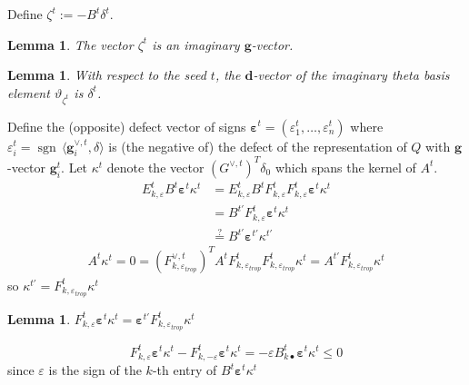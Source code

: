 \documentclass{amsart}
\newtheorem{lemma}[theorem]{Lemma}
\numberwithin{theorem}{section}
\newcommand{\bfd}{\boldsymbol{d}}
\newcommand{\bfg}{\boldsymbol{g}}
\newcommand{\sgn}{{\operatorname{sgn}}}
\begin{document}
  Define $\zeta^t := -B^t \delta^t$.
  \begin{lemma}
    The vector $\zeta^t$ is an imaginary $\bfg$-vector.
  \end{lemma}

  \begin{lemma}
    With respect to the seed $t$, the $\bfd$-vector of the imaginary theta basis element $\vartheta_{\zeta^t}$ is $\delta^t$. 
  \end{lemma}

  Define the (opposite) defect vector of signs $\boldsymbol{\varepsilon}^t=(\varepsilon^t_1,\ldots,\varepsilon^t_n)$ where $\varepsilon^t_i=\sgn\,\langle \bfg^{\vee,t}_i,\delta\rangle$ is (the negative of) the defect of the representation of $Q$ with $\bfg$-vector $\bfg^t_i$.
  Let $\kappa^t$ denote the vector $(G^{\vee,t})^T\delta_0$ which spans the kernel of $A^t$.
  \begin{align*}
    E_{k,\varepsilon}^t B^t \boldsymbol{\varepsilon}^t \kappa^t
    &=
    E_{k,\varepsilon}^t B^t F^t_{k,\varepsilon} F^t_{k,\varepsilon} \boldsymbol{\varepsilon}^t \kappa^t\\
    &=
    B^{t'} F^t_{k,\varepsilon} \boldsymbol{\varepsilon}^t \kappa^t\\
    &\stackrel{?}{=} B^{t'} \boldsymbol{\varepsilon}^{t'} \kappa^{t'}
  \end{align*}
  \begin{align*}
    A^t\kappa^t=0=(F^{\vee,t}_{k,\varepsilon_{trop}})^T A^t F^t_{k,\varepsilon_{trop}} F^t_{k,\varepsilon_{trop}} \kappa^t=A^{t'} F^t_{k,\varepsilon_{trop}} \kappa^t
  \end{align*}
  so $\kappa^{t'}=F^t_{k,\varepsilon_{trop}} \kappa^t$

  \begin{lemma}
    $F^t_{k,\varepsilon} \boldsymbol{\varepsilon}^t \kappa^t = \boldsymbol{\varepsilon}^{t'} F^t_{k,\varepsilon_{trop}} \kappa^t$
  \end{lemma}
  \[F^t_{k,\varepsilon} \boldsymbol{\varepsilon}^t \kappa^t - F^t_{k,-\varepsilon} \boldsymbol{\varepsilon}^t \kappa^t=-\varepsilon B^t_{k\bullet} \boldsymbol{\varepsilon}^t \kappa^t \le 0\]
  since $\varepsilon$ is the sign of the $k$-th entry of $B^t \boldsymbol{\varepsilon}^t \kappa^t$



  
\end{document}
